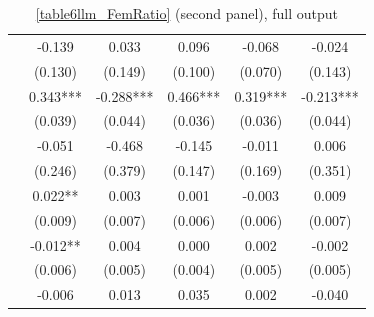 \begin{table}
    \footnotesize
    \centering
    \begin{threeparttable}
        \caption{\autoref{table6llm_FemRatio} (second panel), full output}
        \label{table6llm_change_full}
        \begin{tabular}{p{3cm}S@{}S@{}S@{}S@{}S@{}}
            \toprule
            &{}&{}&{}&{}&{}\\
            \midrule
                  &      -0.139   &       0.033   &       0.096   &      -0.068   &      -0.024   \\
                                          &     (0.130)   &     (0.149)   &     (0.100)   &     (0.070)   &     (0.143)   \\
                  &       0.343***&      -0.288***&       0.466***&       0.319***&      -0.213***\\
                                          &     (0.039)   &     (0.044)   &     (0.036)   &     (0.036)   &     (0.044)   \\
            &      -0.051   &      -0.468   &      -0.145   &      -0.011   &       0.006   \\
                                          &     (0.246)   &     (0.379)   &     (0.147)   &     (0.169)   &     (0.351)   \\
                    &       0.022** &       0.003   &       0.001   &      -0.003   &       0.009   \\
                                          &     (0.009)   &     (0.007)   &     (0.006)   &     (0.006)   &     (0.007)   \\
                    &      -0.012** &       0.004   &       0.000   &       0.002   &      -0.002   \\
                                          &     (0.006)   &     (0.005)   &     (0.004)   &     (0.005)   &     (0.005)   \\
                       &      -0.006   &       0.013   &       0.035   &       0.002   &      -0.040   \\

\end{tabular}
\end{threeparttable}
\end{table}
